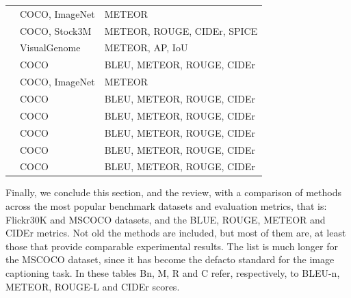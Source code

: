 \begin{longtable}{ p{} p{} p{} }
    \citet{Venugopalan2017} & COCO, ImageNet & METEOR \\
    \citet{Wang2017} & COCO, Stock3M & METEOR, ROUGE, CIDEr, SPICE \\
    \citet{Yang2017} & VisualGenome & METEOR, AP, IoU \\
    \citet{Yao2017_Attr} & COCO & BLEU, METEOR, ROUGE, CIDEr \\
    \citet{Yao2017_NOB} & COCO, ImageNet & METEOR \\
    \citet{Zhang2017} & COCO & BLEU, METEOR, ROUGE, CIDEr \\
    \citet{Aneja2018} & COCO & BLEU, METEOR, ROUGE, CIDEr \\
    \citet{Jiang2018} & COCO & BLEU, METEOR, ROUGE, CIDEr\\
    \citet{Khademi2018} & COCO & BLEU, METEOR, ROUGE, CIDEr\\
    \citet{Wang2018} & COCO & BLEU, METEOR, ROUGE, CIDEr \\
    \bottomrule
\end{longtable}
\label{tab:nn_methods_datasets_metrics}
\endgroup

Finally, we conclude this section, and the review, with a  comparison of methods across the most popular benchmark datasets and evaluation metrics, that is: Flickr30K and MSCOCO datasets, and the BLUE, ROUGE, METEOR and CIDEr metrics. Not old the methods are included, but most of them are, at least those that provide comparable experimental results. The list is much longer for the MSCOCO dataset, since it has become the defacto standard for the image captioning task. In these tables Bn, M, R and C refer, respectively, to BLEU-n, METEOR, ROUGE-L and CIDEr scores.

